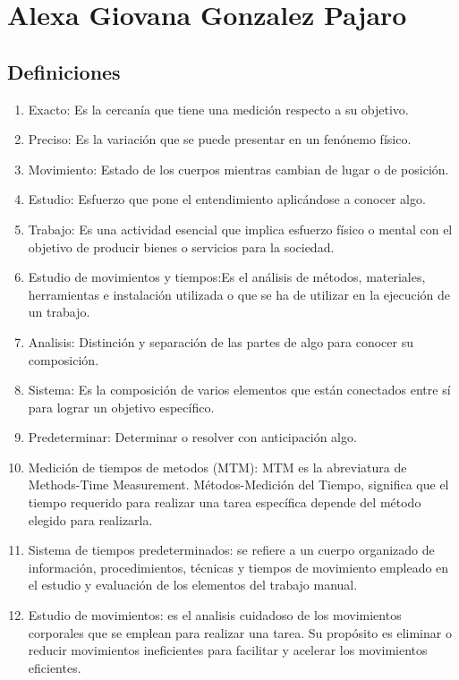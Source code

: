 \section{Alexa Giovana Gonzalez Pajaro}
\subsection{Definiciones}
\begin{enumerate}
    \item Exacto: Es la cercanía que tiene una medición respecto a su objetivo.
    \item Preciso: Es la variación que se puede presentar en un fenónemo físico.
    \item Movimiento: Estado de los cuerpos mientras cambian de lugar o de posición.
    \cite{RAE}
    \item Estudio: Esfuerzo que pone el entendimiento aplicándose a conocer algo.
    \cite{RAE}
    \item Trabajo: Es una actividad esencial que implica esfuerzo físico o mental con el objetivo de producir bienes o servicios para la sociedad.
    \cite{RAE}
    \item Estudio de movimientos y tiempos:Es el análisis de métodos, materiales, herramientas e instalación utilizada o que se ha de utilizar en la ejecución de un trabajo.
    \cite{RAE}
    \item Analisis: Distinción y separación de las partes de algo para conocer su composición.
    \cite{RAE}
    \item Sistema: Es la composición de varios elementos que están conectados entre sí para lograr un objetivo específico.
    \cite{RAE}
    \item Predeterminar: Determinar o resolver con anticipación algo.
    \cite{RAE}
    \item Medición de tiempos de metodos (MTM): MTM es la abreviatura de Methods-Time Measurement. Métodos-Medición del Tiempo, significa que el tiempo requerido para realizar una tarea específica depende del método elegido para realizarla.
    \cite{RAE}
    \item Sistema de tiempos predeterminados: se refiere a un cuerpo organizado de información, procedimientos, técnicas y tiempos de movimiento empleado en el estudio y evaluación de los elementos del trabajo manual. 
    \cite{RAE}
    \item Estudio de movimientos: es el analisis cuidadoso de los movimientos corporales que se emplean para realizar una tarea. Su propósito es eliminar o reducir movimientos ineficientes para facilitar y acelerar los movimientos eficientes.

\end{enumerate}
